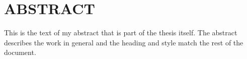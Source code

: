 \chapter*{ABSTRACT}

This is the text of my abstract that is part of the thesis itself.
The abstract describes the work in general and the heading and style
match the rest of the document.
